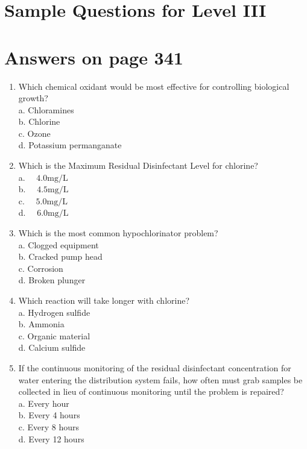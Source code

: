 \documentclass[10pt]{article}
\begin{document}
\section{Sample Questions for Level III}
\section{Answers on page 341}
\begin{enumerate}
  \item Which chemical oxidant would be most effective for controlling biological growth?\\
a. Chloramines\\
b. Chlorine\\
c. Ozone\\
d. Potassium permanganate

  \item Which is the Maximum Residual Disinfectant Level for chlorine?\\
a. $\quad 4.0 \mathrm{mg} / \mathrm{L}$\\
b. $\quad 4.5 \mathrm{mg} / \mathrm{L}$\\
c. $\quad 5.0 \mathrm{mg} / \mathrm{L}$\\
d. $\quad 6.0 \mathrm{mg} / \mathrm{L}$

  \item Which is the most common hypochlorinator problem?\\
a. Clogged equipment\\
b. Cracked pump head\\
c. Corrosion\\
d. Broken plunger

  \item Which reaction will take longer with chlorine?\\
a. Hydrogen sulfide\\
b. Ammonia\\
c. Organic material\\
d. Calcium sulfide

  \item If the continuous monitoring of the residual disinfectant concentration for water entering the distribution system fails, how often must grab samples be collected in lieu of continuous monitoring until the problem is repaired?\\
a. Every hour\\
b. Every 4 hours\\
c. Every 8 hours\\
d. Every 12 hours

\end{enumerate}
\end{document}
